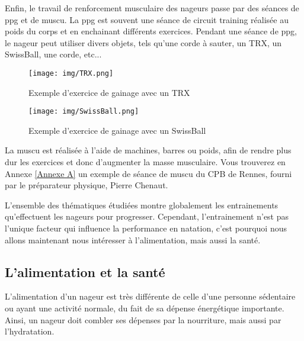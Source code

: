 \vspace{12pt}

Enfin, le travail de renforcement musculaire des nageurs passe par des séances de ppg et de muscu. La ppg est souvent une séance de circuit training réalisée au poids du corps et en enchainant différents exercices. Pendant une séance de ppg, le nageur peut utiliser divers objets, tels qu'une corde à sauter, un TRX, un SwissBall, une corde, etc...

\begin{figure}[h]
\begin{center}
 \texttt{[image: img/TRX.png]}
 \end{center}
 \caption{Exemple d'exercice de gainage avec un TRX}
 \label{Exemple d'exercice de gainage avec un TRX}
\end{figure}

\begin{figure}[h]
\begin{center}
 \texttt{[image: img/SwissBall.png]}
 \end{center}
 \caption{Exemple d'exercice de gainage avec un SwissBall}
 \label{Exemple d'exercice de gainage avec un SwissBall}
\end{figure}

La muscu est réalisée à l'aide de machines, barres ou poids, afin de rendre plus dur les exercices et donc d'augmenter la masse musculaire. Vous trouverez en Annexe \ref{Annexe A} un exemple de séance de muscu du CPB de Rennes, fourni par le préparateur physique, Pierre Chenaut.

\vspace{12pt}

L'ensemble des thématiques étudiées montre globalement les entrainements qu'effectuent les nageurs pour progresser. Cependant, l'entrainement n'est pas l'unique facteur qui influence la performance en natation, c'est pourquoi nous allons maintenant nous intéresser à l'alimentation, mais aussi la santé.


\subsection{L’alimentation et la santé}

L'alimentation d'un nageur est très différente de celle d'une personne sédentaire ou ayant une activité normale, du fait de sa dépense énergétique importante. Ainsi, un nageur doit combler ses dépenses par la nourriture, mais aussi par l'hydratation.


